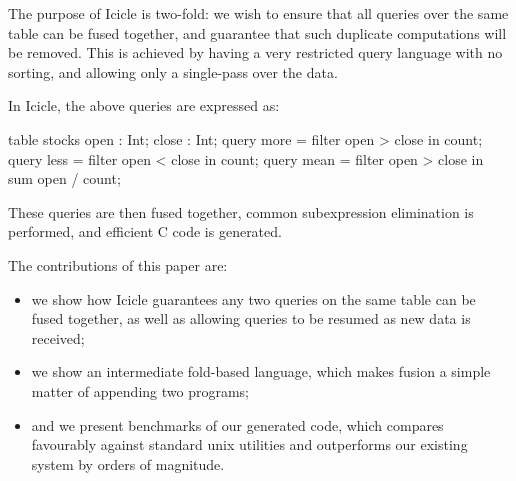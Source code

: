 The purpose of Icicle is two-fold: we wish to ensure that all queries over the same table can be fused together, and guarantee that such duplicate computations will be removed.
This is achieved by having a very restricted query language with no sorting, and allowing only a single-pass over the data.

In Icicle, the above queries are expressed as:
\begin{code}
table stocks { open : Int; close : Int; }
query more = filter open > close in count;
query less = filter open < close in count;
query mean = filter open > close in sum open / count;
\end{code}

These queries are then fused together, common subexpression elimination is performed, and efficient C code is generated.

The contributions of this paper are:
\begin{itemize}
\item
we show how Icicle guarantees any two queries on the same table can be fused together, as well as allowing queries to be resumed as new data is received;

\item
we show an intermediate fold-based language, which makes fusion a simple matter of appending two programs;

\item
and we present benchmarks of our generated code, which compares favourably against standard unix utilities and outperforms our existing system by orders of magnitude.
\end{itemize}
